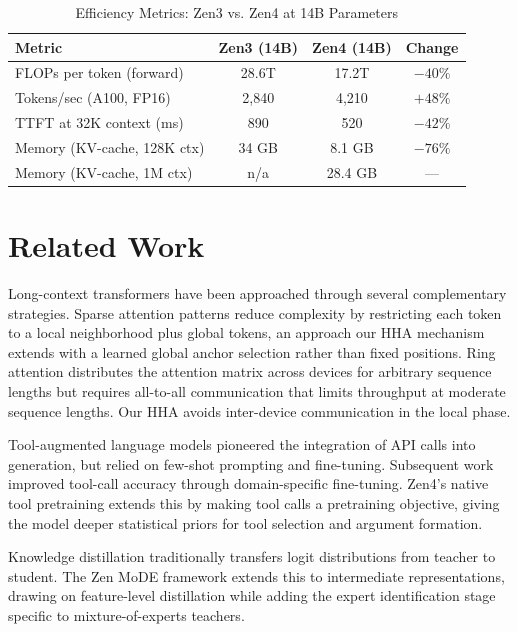 \documentclass[11pt,a4paper]{article}
\begin{document}
\begin{table}[H]
\centering
\begin{tabular}{lccc}
\toprule
\textbf{Metric} & \textbf{Zen3 (14B)} & \textbf{Zen4 (14B)} & \textbf{Change} \\
\midrule
FLOPs per token (forward)     & 28.6T & 17.2T & $-40\%$ \\
Tokens/sec (A100, FP16)       & 2,840 & 4,210 & $+48\%$ \\
TTFT at 32K context (ms)      & 890   & 520   & $-42\%$ \\
Memory (KV-cache, 128K ctx)   & 34 GB & 8.1 GB & $-76\%$ \\
Memory (KV-cache, 1M ctx)     & n/a   & 28.4 GB & --- \\
\bottomrule
\end{tabular}
\caption{Efficiency Metrics: Zen3 vs. Zen4 at 14B Parameters}
\end{table}

\section{Related Work}

Long-context transformers have been approached through several complementary strategies.
Sparse attention patterns \cite{beltagy2020longformer} reduce complexity by restricting
each token to a local neighborhood plus global tokens, an approach our HHA mechanism
extends with a learned global anchor selection rather than fixed positions. Ring attention
\cite{liu2023ring} distributes the attention matrix across devices for arbitrary sequence
lengths but requires all-to-all communication that limits throughput at moderate sequence
lengths. Our HHA avoids inter-device communication in the local phase.

Tool-augmented language models \cite{schick2023toolformer} pioneered the integration of
API calls into generation, but relied on few-shot prompting and fine-tuning. Subsequent
work \cite{patil2023gorilla} improved tool-call accuracy through domain-specific fine-tuning.
Zen4's native tool pretraining extends this by making tool calls a pretraining objective,
giving the model deeper statistical priors for tool selection and argument formation.

Knowledge distillation \cite{hinton2015distilling} traditionally transfers logit distributions
from teacher to student. The Zen MoDE framework extends this to intermediate representations,
drawing on feature-level distillation \cite{romero2014fitnets} while adding the expert
identification stage specific to mixture-of-experts teachers.
\end{document}
